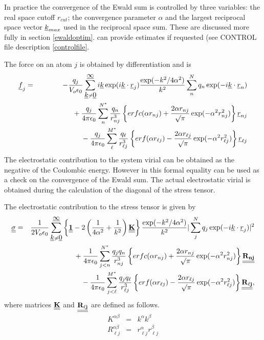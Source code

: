 In practice the convergence of the Ewald sum is controlled by three
variables: the real space cutoff $r_{cut}$; the convergence parameter
$\alpha$ and the largest reciprocal space vector $\mbox{$\underline{k}$}_{max}$ used
in the reciprocal space sum. These are discussed more fully in section
\ref{ewaldoptim}.  \D{} can provide estimates if requested (see CONTROL
file description \ref{controlfile}.

The force on an atom $j$ is obtained by differentiation and is
\begin{eqnarray}
\mbox{$\underline{f}$}_{j}&=&-\frac{q_{j}}{V_{o}\epsilon_{0}}
 \sum_{\mbox{$\underline{k}$}\neq\mbox{$\underline{0}$}}^{\mbox{$\underline{\infty}$}}
i\mbox{$\underline{k}$}\exp(i\mbox{$\underline{k}$}\cdot\mbox{$\underline{r}$}_{j})\frac{\exp(-k^{2}/4\alpha^{2})}{k^{2}}
\sum_{n}^{N}q_{n}\exp(-i\mbox{$\underline{k}$}\cdot\mbox{$\underline{r}$}_{n})\nonumber \\
 & &\phantom{xxxxx} +\frac{q_{j}}{4\pi\epsilon_{0}}\sum_{n}^{N^{*}}\frac{q_{n}}{r_{nj}^{3}}
\left\{ erfc(\alpha r_{nj})+
\frac{2\alpha r_{nj}}{\surd\pi}\exp(-\alpha^{2}r_{nj}^{2})\right \} \mbox{$\underline{r}$}_{nj}\\
 & &\phantom{xxxxxxxxxx}
-\frac{q_{j}}{4\pi\epsilon_{0}}\sum_{\ell}^{M^{*}}\frac{q_{\ell}}{r_{\ell j}^{3}}
\left\{ erf(\alpha r_{\ell j})-
\frac{2\alpha r_{\ell j}}{\surd\pi}\exp(-\alpha^{2}r_{\ell j}^{2})\right
\}\mbox{$\underline{r}$}_{\ell j}\nonumber
\end{eqnarray}
The electrostatic contribution to the system virial can be obtained as
the negative of the Coulombic energy. However in \D{} this
formal equality can be used as a check on the convergence of the Ewald
sum. The actual electrostatic virial is obtained during the
calculation of the diagonal of the stress tensor.

The electrostatic contribution to the stress tensor is given by
\begin{eqnarray}
\mbox{$\underline{\underline{\bf \sigma}}$}&=&
\frac{1}{2V_{o}\epsilon_{0}}
\sum_{\mbox{$\underline{k}$}\neq\mbox{$\underline{0}$}}^{\mbox{$\underline{\infty}$}}
\left\{\mbox{$\underline{\underline{\bf 1}}$}-2\left (\frac{1}{4\alpha^{2}}+\frac{1}{k^{2}}\right
)\mbox{$\underline{\underline{\bf K}}$}\right \}
\frac{\exp(-k^{2}/4\alpha^{2})}{k^{2}}
|\sum_{j}^{N}q_{j}\exp(-i\mbox{$\underline{k}$}\cdot\mbox{$\underline{r}$}_{j})|^{2} \nonumber \\
 & &\phantom{xxxxx}+\frac{1}{4\pi\epsilon_{0}}\sum_{j<n}^{N^{*}}\frac{q_{j}q_{n}}{r_{nj}^{3}}
\left\{ erfc(\alpha r_{nj})+
\frac{2\alpha r_{nj}}{\surd\pi}\exp(-\alpha^{2}r_{nj}^{2})\right \}
\mbox{$\underline{\underline{\bf R_{nj}}}$} \\
 & &\phantom{xxxxxxxxxx}
-\frac{1}{4\pi\epsilon_{0}}\sum_{j<\ell}^{M^{*}}\frac{q_{j}q_{\ell}}{r_{\ell j}^{3}}
\left\{ erf(\alpha r_{\ell j})-
\frac{2\alpha r_{\ell j}}{\surd\pi}\exp(-\alpha^{2}r_{\ell j}^{2})\right
\}\mbox{$\underline{\underline{\bf R_{\ell j}}}$},\nonumber
\end{eqnarray}
where matrices $\mbox{$\underline{\underline{\bf K}}$}$ and $\mbox{$\underline{\underline{\bf R_{\ell j}}}$}$ are defined as follows.
\begin{eqnarray}
K^{\alpha\beta}&=&k^{\alpha}k^{\beta}\\
R_{\ell j}^{\alpha\beta}&=&r_{\ell j}^{\alpha}r_{\ell j}^{\beta}
\end{eqnarray}

